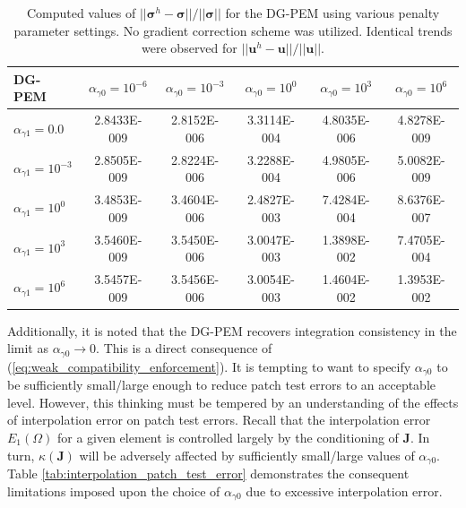 \begin{table}[!ht]
  \begin{center}
    \begin{tabular}{| l || c | c | c | c | c |}
    \hline
    DG-PEM & $\alpha_{\gamma0} = 10^{-6}$ & $\alpha_{\gamma0} = 10^{-3}$ & $\alpha_{\gamma0} = 10^{0}$ & $\alpha_{\gamma0} = 10^{3}$ & $\alpha_{\gamma0} = 10^{6}$ \\ \hline \hline
    	$\alpha_{\gamma1} = 0.0$ & 2.8433E-009 & 2.8152E-006 & 3.3114E-004 & 4.8035E-006 & 4.8278E-009 \\ \hline
    $\alpha_{\gamma1} = 10^{-3}$ & 2.8505E-009 & 2.8224E-006 & 3.2288E-004 & 4.9805E-006 & 5.0082E-009 \\ \hline
    $\alpha_{\gamma1} = 10^{0}$ & 3.4853E-009 & 3.4604E-006 & 2.4827E-003 &  7.4284E-004 & 8.6376E-007 \\ \hline
    $\alpha_{\gamma1} = 10^{3}$ & 3.5460E-009 & 3.5450E-006 & 3.0047E-003 & 1.3898E-002 & 7.4705E-004 \\ \hline
    $\alpha_{\gamma1} = 10^{6}$ & 3.5457E-009 & 3.5456E-006 & 3.0054E-003 & 1.4604E-002 & 1.3953E-002 \\
    \hline
    \end{tabular}
    \caption{Computed values of $||\boldsymbol{\sigma}^h - \boldsymbol{\sigma}|| / ||\boldsymbol{\sigma}||$ for the DG-PEM using various penalty parameter settings. No gradient correction scheme was utilized. Identical trends were observed for $||\mathbf{u}^h - \mathbf{u}|| / ||\mathbf{u}||$.}
    \vspace{-5pt}
    \label{tab:linear_patch_test_parameter_study}
    \vspace{-10pt}
  \end{center}
\end{table}

Additionally, it is noted that the DG-PEM recovers integration consistency in the limit as $\alpha_{\gamma0} \rightarrow 0$. This is a direct consequence of (\ref{eq:weak_compatibility_enforcement}). It is tempting to want to specify $\alpha_{\gamma0}$ to be sufficiently small/large enough to reduce patch test errors to an acceptable level. However, this thinking must be tempered by an understanding of the effects of interpolation error on patch test errors. Recall that the interpolation error $E_1 (\Omega)$ for a given element is controlled largely by the conditioning of $\mathbf{J}$. In turn, $\kappa (\mathbf{J})$ will be adversely affected by sufficiently small/large values of $\alpha_{\gamma0}$. Table \ref{tab:interpolation_patch_test_error} demonstrates the consequent limitations imposed upon the choice of $\alpha_{\gamma0}$ due to excessive interpolation error.

